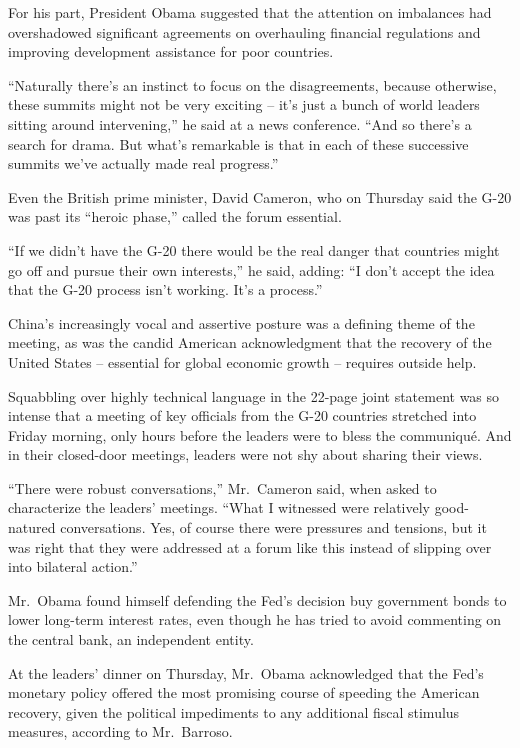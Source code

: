 ﻿\documentclass[12pt]{article}
\begin{document}
For his part, President Obama suggested that the attention on imbalances had overshadowed
significant agreements on overhauling financial regulations and improving development assistance for
poor countries.

``Naturally there's an instinct to focus on the disagreements, because otherwise, these summits
might not be very exciting -- it's just a bunch of world leaders sitting around intervening,'' he
said at a news conference. ``And so there's a search for drama. But what's remarkable is that in
each of these successive summits we've actually made real progress.''

Even the British prime minister, David Cameron, who on Thursday said the G-20 was past its ``heroic
phase,'' called the forum essential.

``If we didn't have the G-20 there would be the real danger that countries might go off and pursue
their own interests,'' he said, adding: ``I don't accept the idea that the G-20 process isn't
working. It's a process.''

China's increasingly vocal and assertive posture was a defining theme of the meeting, as was the
candid American acknowledgment that the recovery of the United States -- essential for global
economic growth -- requires outside help.

Squabbling over highly technical language in the 22-page joint statement was so intense that a
meeting of key officials from the G-20 countries stretched into Friday morning, only hours before
the leaders were to bless the communiqu\'e. And in their closed-door meetings, leaders were not shy
about sharing their views.

``There were robust conversations,'' Mr.~Cameron said, when asked to characterize the leaders'
meetings. ``What I witnessed were relatively good-natured conversations. Yes, of course there were
pressures and tensions, but it was right that they were addressed at a forum like this instead of
slipping over into bilateral action.''

Mr.~Obama found himself defending the Fed's decision buy government bonds to lower long-term
interest rates, even though he has tried to avoid commenting on the central bank, an independent
entity.

At the leaders' dinner on Thursday, Mr.~Obama acknowledged that the Fed's monetary policy offered
the most promising course of speeding the American recovery, given the political impediments to any
additional fiscal stimulus measures, according to Mr.~Barroso.
\end{document}
